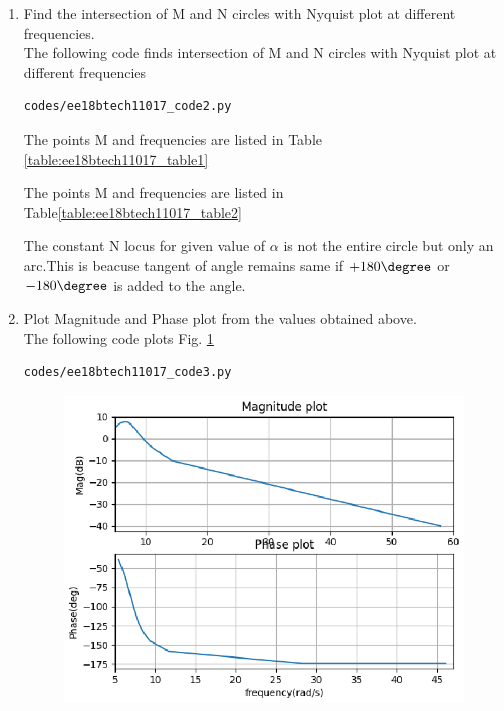 \begin{enumerate}[label=\thesection.\arabic*.,ref=\thesection.\theenumi]
\item
Find the intersection of M and N circles with Nyquist plot at different frequencies. \\
\solution 
The following code finds intersection of M and N circles with Nyquist plot at different frequencies
\begin{lstlisting}
codes/ee18btech11017_code2.py
\end{lstlisting}

The points M and frequencies are listed in Table  \ref{table:ee18btech11017_table1}
\begin{table}[!ht]
\centering

\caption{}
\label{table:ee18btech11017_table1}
\end{table}


The points M and frequencies are listed in Table\ref{table:ee18btech11017_table2}
\begin{table}[!ht]
\centering

\caption{}
\label{table:ee18btech11017_table2}
\end{table}

The constant N locus for given value of $\alpha$ is not the entire circle but only an arc.This is beacuse tangent of angle remains same if $+180\degree$ or 
$-180\degree$ is added to the angle.



\item
Plot Magnitude and Phase plot from the values obtained above.\\
\solution
The following code plots Fig. \ref{fig:ee18btech11017_fig2}
\begin{lstlisting}
codes/ee18btech11017_code3.py
\end{lstlisting}

\begin{figure}[!h]
  \includegraphics[width=\columnwidth]{./figs/ee18btech11017_fig2.eps}
 \caption{}
  \label{fig:ee18btech11017_fig2}
\end{figure}



\end{enumerate}
